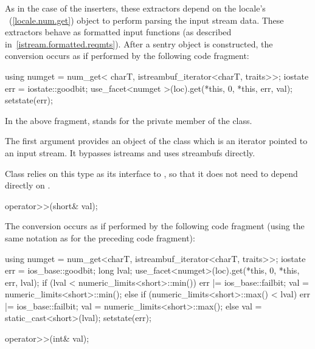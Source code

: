 \begin{itemdescr}
\pnum
As in the case of the inserters, these extractors depend on the
locale's
~(\ref{locale.num.get}) object to perform parsing the input
stream data.
These extractors behave as formatted input functions (as described in~\ref{istream.formatted.reqmts}).  After a sentry object is constructed, the
conversion occurs as if performed by the following code fragment:

\begin{codeblock}
using numget = num_get< charT, istreambuf_iterator<charT, traits>>;
iostate err = iostate::goodbit;
use_facet<numget >(loc).get(*this, 0, *this, err, val);
setstate(err);
\end{codeblock}

In the above fragment,
stands for the private member of the
class.
\begin{note}
The first argument provides an object of the
class which is an iterator pointed to an input stream.
It bypasses istreams and uses streambufs directly.
\end{note}
Class
relies on this
type as its interface to
,
so that it does not need to depend directly on
.
\end{itemdescr}

%
\begin{itemdecl}
operator>>(short& val);
\end{itemdecl}

\begin{itemdescr}
\pnum
The conversion occurs as if performed by the following code fragment
(using the same notation as for the preceding code fragment):
\begin{codeblock}
using numget = num_get<charT, istreambuf_iterator<charT, traits>>;
iostate err = ios_base::goodbit;
long lval;
use_facet<numget>(loc).get(*this, 0, *this, err, lval);
if (lval < numeric_limits<short>::min()) {
  err |= ios_base::failbit;
  val = numeric_limits<short>::min();
} else if (numeric_limits<short>::max() < lval) {
  err |= ios_base::failbit;
  val = numeric_limits<short>::max();
}  else
  val = static_cast<short>(lval);
setstate(err);
\end{codeblock}
\end{itemdescr}

%
\begin{itemdecl}
operator>>(int& val);
\end{itemdecl}

